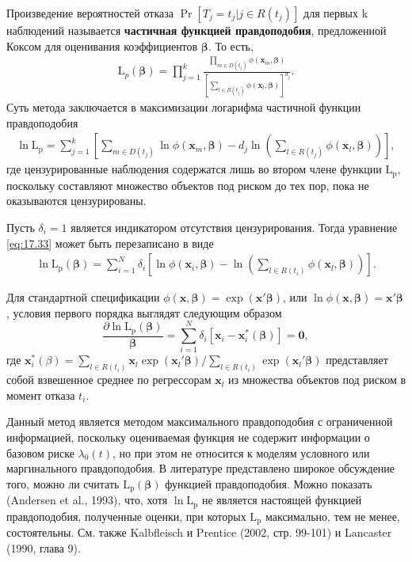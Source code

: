 Произведение вероятностей отказа $\Pr\left[T_j=t_j|j\in R(t_j)\right]$ для первых k наблюдений называется \textbf{частичная функцией  правдоподобия}, предложенной Коксом для оценивания коэффициентов $\bm{\beta}$. То есть,
        \begin{align}
        \label{eq:17.32}
        \mathrm{L}_p(\bm{\beta})=\prod^{k}_{j=1}\frac{\prod_{m\in D(t_j)}\phi(\mathbf{x}_m,\bm{\beta})}{\left[\sum_{l\in R(t_j)} \phi(\mathbf{x}_l,\bm{\beta})\right]^{d_j}}.
        \end{align}
Суть метода заключается в максимизации логарифма частичной функции правдоподобия %
        \begin{align}
        \label{eq:17.33}
        \ln\mathrm{L_p}=\sum^{k}_{j=1}\left[\sum_{m\in D(t_j)}\ln\phi(\mathbf{x}_m,\bm{\beta})-d_j\ln\left(\sum_{l\in R(t_j)}\phi(\mathbf{x}_l,\bm{\beta})\right)\right],
        \end{align}
где цензурированные наблюдения содержатся лишь во втором члене функции $\mathrm{L_p}$, поскольку составляют множество объектов под риском до тех пор, пока не оказываются цензурированы.

Пусть $\delta_i = 1$ является индикатором отсутствия цензурирования. Тогда уравнение \ref{eq:17.33} может быть перезаписано в виде
        \begin{align}
        \label{eq:17.34}
        \ln\mathrm{L_p}(\bm{\beta})=\sum^{N}_{i=1}\delta_i\left[\ln\phi(\mathbf{x}_i,\bm{\beta})-\ln\left(\sum_{l\in R(t_i)}\phi(\mathbf{x}_l,\bm{\beta})\right)\right].
        \end{align}

Для стандартной спецификации $\phi(\mathbf{x},\bm{\beta})=\exp(\mathbf{x}'\bm{\beta})$, или $\ln\phi(\mathbf{x},\bm{\beta})=\mathbf{x}'\bm{\beta}$, условия первого порядка выглядят следующим образом
        $$\frac{\partial\ln\mathrm{L_p}(\bm{\beta})}{\bm{\beta}}=\sum^{N}_{i=1}\delta_i[\mathbf{x}_i-\mathbf{x}^*_i(\bm{\beta})]=\mathbf{0},$$
где $\mathbf{x}^*_i (\beta)=\sum_{l\in R(t_i)}\mathbf{x}_l\exp(\mathbf{x}_l'\bm{\beta})/\sum_{l\in R(t_i)}\exp(\mathbf{x}_l'\bm{\beta})$ представляет собой взвешенное среднее по регрессорам $\mathbf{x}_l$ из множества объектов под риском в момент отказа $t_i$.

Данный метод является методом максимального правдоподобия с ограниченной информацией, поскольку оцениваемая функция не содержит информации о базовом риске $\lambda_0(t)$, но при этом не относится к моделям условного или маргинального правдоподобия. В литературе представлено широкое обсуждение того, можно ли считать $\mathrm{L_p}(\bm{\beta})$ функцией правдоподобия. Можно показать (Andersen et al., 1993), что, хотя $\ln \mathrm{L_p}$ не является настоящей функцией правдоподобия, полученные оценки, при которых $\mathrm{L_p}$ максимально, тем не менее, состоятельны. См. также Kalbfleisch и Prentice (2002, стр. 99-101) и Lancaster (1990, глава 9).


